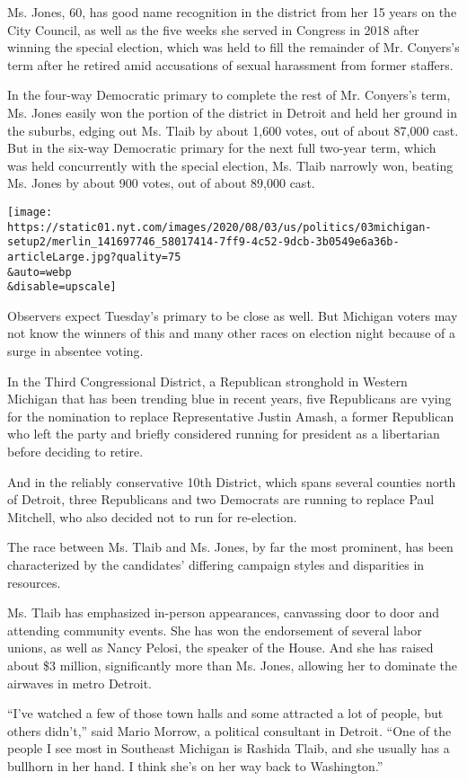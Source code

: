 Ms. Jones, 60, has good name recognition in the district from her 15
years on the City Council, as well as the five weeks she served in
Congress in 2018 after winning the special election, which was held to
fill the remainder of Mr. Conyers's term after he retired amid
accusations of sexual harassment from former staffers.

In the four-way Democratic primary to complete the rest of Mr. Conyers's
term, Ms. Jones easily won the portion of the district in Detroit and
held her ground in the suburbs, edging out Ms. Tlaib by about 1,600
votes, out of about 87,000 cast. But in the six-way Democratic primary
for the next full two-year term, which was held concurrently with the
special election, Ms. Tlaib narrowly won, beating Ms. Jones by about 900
votes, out of about 89,000 cast.

\texttt{[image: https://static01.nyt.com/images/2020/08/03/us/politics/03michigan-setup2/merlin\_141697746\_58017414-7ff9-4c52-9dcb-3b0549e6a36b-articleLarge.jpg?quality=75\\\&auto=webp\\\&disable=upscale]}

Observers expect Tuesday's primary to be close as well. But Michigan
voters may not know the winners of this and many other races on election
night because of a surge in absentee voting.

In the Third Congressional District, a Republican stronghold in Western
Michigan that has been trending blue in recent years, five Republicans
are vying for the nomination to replace Representative Justin Amash, a
former Republican who left the party and briefly considered running for
president as a libertarian before deciding to retire.

And in the reliably conservative 10th District, which spans several
counties north of Detroit, three Republicans and two Democrats are
running to replace Paul Mitchell, who also decided not to run for
re-election.

The race between Ms. Tlaib and Ms. Jones, by far the most prominent, has
been characterized by the candidates' differing campaign styles and
disparities in resources.

Ms. Tlaib has emphasized in-person appearances, canvassing door to door
and attending community events. She has won the endorsement of several
labor unions, as well as Nancy Pelosi, the speaker of the House. And she
has raised about \$3 million, significantly more than Ms. Jones,
allowing her to dominate the airwaves in metro Detroit.

``I've watched a few of those town halls and some attracted a lot of
people, but others didn't,'' said Mario Morrow, a political consultant
in Detroit. ``One of the people I see most in Southeast Michigan is
Rashida Tlaib, and she usually has a bullhorn in her hand. I think she's
on her way back to Washington.''

